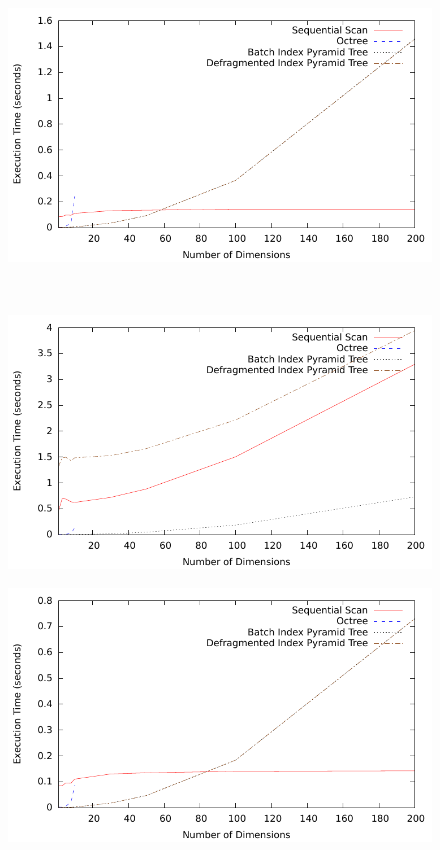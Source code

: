 \begin{figure}
		\begin{center}
			\begin{subfloat}{%
				\includegraphics[scale=0.5]{figures/performance_analysis/iteration_1/all_insert_randuniform.pdf}
			}
			\end{subfloat}~
			\begin{subfloat} {%
				\includegraphics[scale=0.5]{figures/performance_analysis/iteration_1/all_delete_randuniform.pdf}
			}
			\end{subfloat}
			\begin{subfloat} {%
				\includegraphics[scale=0.5]{figures/performance_analysis/iteration_1/all_pquery_randuniform.pdf}
			}
			\end{subfloat}  
		\end{center}


\end{figure}
